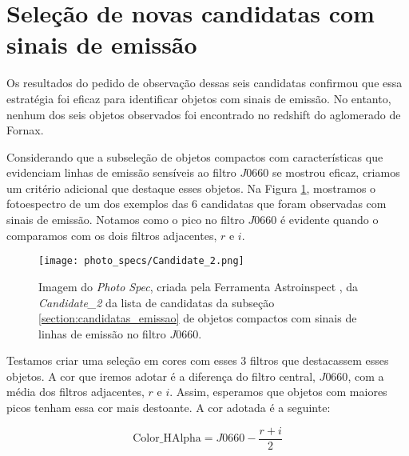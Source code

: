 \section{Seleção de novas candidatas com sinais de emissão} \label{subsec:candidatas_emissao}
Os resultados do pedido de observação dessas seis candidatas confirmou que essa estratégia foi eficaz para identificar objetos com sinais de emissão. No entanto, nenhum dos seis objetos observados foi encontrado no redshift do aglomerado de Fornax.

Considerando que a subseleção de objetos compactos com características que evidenciam linhas de emissão sensíveis ao filtro $J0660$ se mostrou eficaz, criamos um critério adicional que destaque esses objetos. Na Figura \ref{ex_photospec_f600}, mostramos o fotoespectro de um dos exemplos das 6 candidatas que foram observadas com sinais de emissão. Notamos como o pico no filtro $J0660$ é evidente quando o comparamos com os dois filtros adjacentes, $r$ e $i$.

\begin{figure}[!ht]
    \begin{center}
    \texttt{[image: photo\_specs/Candidate\_2.png]}
    \caption[]{Imagem do \textit{Photo Spec}, criada pela Ferramenta Astroinspect \cite{astroinspect}, da \textit{Candidate\_2} da lista de candidatas da subseção \ref{section:candidatas_emissao} de objetos compactos com sinais de linhas de emissão no filtro $J0660$.}
    \label{ex_photospec_f600}
    \end{center}
\end{figure}

Testamos criar uma seleção em cores com esses 3 filtros que destacassem esses objetos. A cor que iremos adotar é a diferença do filtro central, $J0660$, com a média dos filtros adjacentes, $r$ e $i$. Assim, esperamos que objetos com maiores picos tenham essa cor mais destoante. A cor adotada é a seguinte:

\begin{equation}
    \text{Color\_HAlpha} = J0660 - \frac{r + i}{2}
    \label{equantion_halpha_color}
\end{equation}


